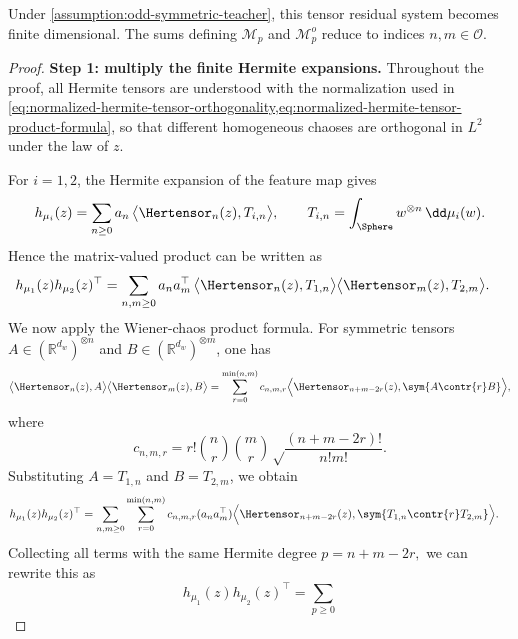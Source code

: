 \begin{remark}
    Under \cref{assumption:odd-symmetric-teacher}, this tensor residual system becomes finite dimensional. The sums defining \(\mathcal M_p\) and \(\mathcal M_p^o\) reduce to indices \(n,m\in\mathcal O\).
\end{remark}
\begin{proof}
\noindent\textbf{Step 1: multiply the finite Hermite expansions.}
Throughout the proof, all
Hermite tensors are understood with the normalization used in
\cref{eq:normalized-hermite-tensor-orthogonality,eq:normalized-hermite-tensor-product-formula}, so that different homogeneous chaoses are
orthogonal in \(L^2\) under the law of \(z\).

For \(i=1,2\), the Hermite expansion of the feature map gives
\begin{equation}
    h_{\mu_i}(z)
    =
    \sum_{n\ge0}
    a_n\,
    \big\langle \Hertensor_n(z),T_{i,n}\big\rangle,
    \qquad
    T_{i,n}
    =
    \int_{\Sphere} w^{\otimes n}\,\dd\mu_i(w).
\end{equation}
Hence the matrix-valued product can be written as
\begin{align}
    h_{\mu_1}(z)h_{\mu_2}(z)^\top
    &=
    \sum_{n,m\ge0}
    a_n a_m^\top\,
    \big\langle \Hertensor_n(z),T_{1,n}\big\rangle
    \big\langle \Hertensor_m(z),T_{2,m}\big\rangle .
\end{align}
We now apply the Wiener-chaos product formula.  For symmetric tensors
\(A\in (\mathbb R^{d_w})^{\otimes n}\) and
\(B\in(\mathbb R^{d_w})^{\otimes m}\), one has
\begin{equation}
    \big\langle \Hertensor_n(z),A\big\rangle
    \big\langle \Hertensor_m(z),B\big\rangle
    =
    \sum_{r=0}^{\min(n,m)}
    c_{n,m,r}
    \Big\langle
        \Hertensor_{n+m-2r}(z),
        \sym{A\contr{r}B}
    \Big\rangle,
\end{equation}
where
\[
    c_{n,m,r}
    =
    r!\binom nr\binom mr \sqrt\frac{(n+m-2r)!}{n!m!}.
\]
Substituting \(A=T_{1,n}\) and \(B=T_{2,m}\), we obtain
\begin{align}
    h_{\mu_1}(z)h_{\mu_2}(z)^\top
    &=
    \sum_{n,m\ge0}
    \sum_{r=0}^{\min(n,m)}
    c_{n,m,r}
    (a_n a_m^\top)
    \Big\langle
        \Hertensor_{n+m-2r}(z),
        \sym{T_{1,n}\contr{r}T_{2,m}}
    \Big\rangle .
\end{align}
Collecting all terms with the same Hermite degree $p=n+m-2r,$
we can rewrite this as
\begin{equation}
    h_{\mu_1}(z)h_{\mu_2}(z)^\top
    =
    \sum_{p\ge0}

\end{equation}
\end{proof}

